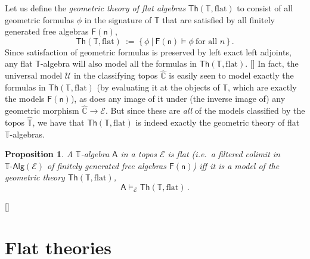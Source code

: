 \documentclass[12pt]{article}
\newcommand{\ednote}[1]{[\textit{\color{red}{#1}}]} %
\newcommand{\C}{\ensuremath{\mathbb{C}}}
\newcommand{\T}{\ensuremath{\mathbb{T}}}
\newcommand{\EE}{\ensuremath{\mathcal{E}}}
\newcommand{\pshat}[1]{\ensuremath{\widehat{#1}}}
\newcommand{\TAlg}{\ensuremath{\T\text{-}\mathsf{Alg}}}
\newcommand{\alg}[1]{\ensuremath{\mathsf{#1}}}
\newcommand{\algA}{\ensuremath{\mathsf{A}}}
\renewcommand{\to}{\ensuremath{\rightarrow}}
\newtheorem{proposition}[theorem]{Proposition}
\theoremstyle{remark}
\theoremstyle{definition}
\begin{document}
Let us define the \emph{geometric theory of flat algebras} $\mathsf{Th}(\T,\mathrm{flat})$ to consist of all geometric formulas $\phi$ in the signature of $\T$ that are satisfied by all finitely generated free algebras $\alg{F(n)}$,
\[
\mathsf{Th}(\T,\mathrm{flat})\ :=\ \{\, \phi\ |\ \alg{F(n)}\models \phi\ \text{for all $n$}\,\} \,.
\]
Since satisfaction of geometric formulas is preserved by left exact left adjoints, any flat $\T$-algebra will also model all the formulas in $\mathsf{Th}(\T,\mathrm{flat})$. \ednote{elaborate!} In fact, the universal model $\mathcal{U}$ in the classifying topos $\pshat{\C}$ is easily seen to model exactly the formulas in $\mathsf{Th}(\T,\mathrm{flat})$ (by evaluating it at the objects of $\T$, which are exactly the models $\alg{F(n)}$), as does any image of it under (the inverse image of) any geometric morphism $\pshat{\C} \to \EE$.  But since these are \emph{all} of the models classified by the topos $\pshat{\T}$, we have that $\mathsf{Th}(\T,\mathrm{flat})$ is indeed exactly the geometric theory of flat $\T$-algebras.

\begin{proposition}
A $\T$-algebra $\algA$ in a topos $\EE$ is flat (i.e.\ a filtered colimit in $\TAlg(\EE)$ of finitely generated free algebras $\alg{F(n)}$) iff it is a model of the geometric theory $\mathsf{Th}(\T,\mathrm{flat})$,
\[
\algA\models_{\EE} \mathsf{Th}(\T,\mathrm{flat})\,.
\]
\end{proposition}

\ednote{fill in the proof, which is standard.}

\section{Flat theories}
\end{document}
